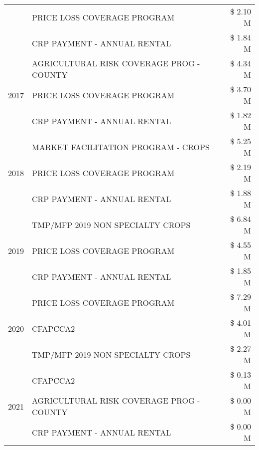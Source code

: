 \begin{tabular}{llr}
 & PRICE LOSS COVERAGE PROGRAM & \$ 2.10 M \\
 & CRP PAYMENT - ANNUAL RENTAL & \$ 1.84 M \\
\cline{1-3}
\multirow[t]{3}{*}{2017} & AGRICULTURAL RISK COVERAGE PROG - COUNTY & \$ 4.34 M \\
 & PRICE LOSS COVERAGE PROGRAM & \$ 3.70 M \\
 & CRP PAYMENT - ANNUAL RENTAL & \$ 1.82 M \\
\cline{1-3}
\multirow[t]{3}{*}{2018} & MARKET FACILITATION PROGRAM - CROPS & \$ 5.25 M \\
 & PRICE LOSS COVERAGE PROGRAM & \$ 2.19 M \\
 & CRP PAYMENT - ANNUAL RENTAL & \$ 1.88 M \\
\cline{1-3}
\multirow[t]{3}{*}{2019} & TMP/MFP 2019 NON SPECIALTY CROPS & \$ 6.84 M \\
 & PRICE LOSS COVERAGE PROGRAM & \$ 4.55 M \\
 & CRP PAYMENT - ANNUAL RENTAL & \$ 1.85 M \\
\cline{1-3}
\multirow[t]{3}{*}{2020} & PRICE LOSS COVERAGE PROGRAM & \$ 7.29 M \\
 & CFAPCCA2 & \$ 4.01 M \\
 & TMP/MFP 2019 NON SPECIALTY CROPS & \$ 2.27 M \\
\cline{1-3}
\multirow[t]{3}{*}{2021} & CFAPCCA2 & \$ 0.13 M \\
 & AGRICULTURAL RISK COVERAGE PROG - COUNTY & \$ 0.00 M \\
 & CRP PAYMENT - ANNUAL RENTAL & \$ 0.00 M \\
\cline{1-3}
\bottomrule
\end{tabular}
